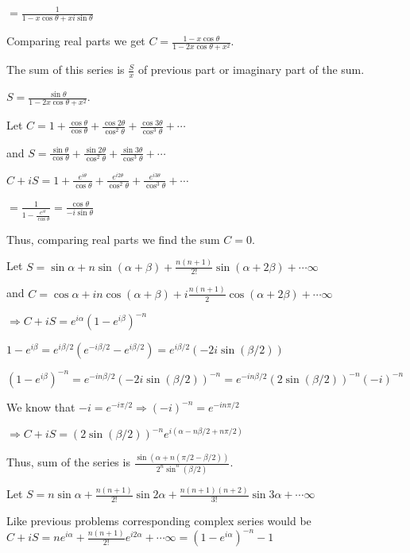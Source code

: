   $= \frac{1}{1 - x\cos\theta + xi\sin\theta}$

  Comparing real parts we get $C = \frac{1 - x\cos\theta}{1 - 2x\cos\theta + x^2}$.
\item The sum of this series is $\frac{S}{x}$ of previous part or imaginary part of the sum.

  $S = \frac{\sin\theta}{1 - 2x\cos\theta + x^2}$.
\item Let $C = 1 + \frac{\cos\theta}{\cos\theta} + \frac{\cos2\theta}{\cos^2\theta} +
  \frac{\cos3\theta}{\cos^3\theta} + \cdots$

  and $S = \frac{\sin\theta}{\cos\theta} + \frac{\sin2\theta}{\cos^2\theta} +
  \frac{\sin3\theta}{\cos^3\theta} + \cdots$

  $C + iS = 1 + \frac{e^{i\theta}}{\cos\theta} + \frac{e^{i2\theta}}{\cos^2\theta} +
  \frac{e^{i3\theta}}{\cos^3\theta} + \cdots$

  $= \frac{1}{1 - \frac{e^{i\theta}}{\cos\theta}} = \frac{\cos\theta}{-i\sin\theta}$

  Thus, comparing real parts we find the sum $C = 0$.
\item Let $S = \sin\alpha + n\sin(\alpha + \beta) + \frac{n(n + 1)}{2!}\sin(\alpha +
  2\beta) + \cdots \infty$

  and $C = \cos\alpha + in\cos(\alpha + \beta) + i\frac{n(n + 1)}{2}\cos(\alpha + 2\beta) + \cdots \infty$

  $\Rightarrow C + iS = e^{i\alpha}\left(1 - e^{i\beta}\right)^{-n}$

  $1 - e^{i\beta} = e^{i\beta/2}\left(e^{-i\beta/2} - e^{i\beta/2}\right) = e^{i\beta/2}(-2i\sin(\beta/2))$

  $\left(1 - e^{i\beta}\right)^{-n} = e^{-in\beta/2}\left(-2i\sin(\beta/2)\right)^{-n} =
  e^{-in\beta/2}\left(2\sin(\beta/2)\right)^{-n}(-i)^{-n}$

  We know that $-i = e^{-i\pi/2}\Rightarrow (-i)^{-n} = e^{-in\pi/2}$

  $\Rightarrow C + iS = (2\sin(\beta/2))^{-n}e^{i(\alpha - n\beta/2 + n\pi/2)}$

  Thus, sum of the series is $\frac{\sin(\alpha + n(\pi/2 - \beta/2))}{2^n\sin^n(\beta/2)}$.
\item Let $S = n\sin\alpha + \frac{n(n + 1)}{2!}\sin2\alpha + \frac{n(n + 1)(n +
  2)}{3!}\sin3\alpha + \cdots \infty$

  Like previous problems corresponding complex series would be $C + iS = ne^{i\alpha} + \frac{n(n +
    1)}{2!}e^{i2\alpha} + \cdots \infty = \left(1 - e^{i\alpha}\right)^{-n} - 1$

